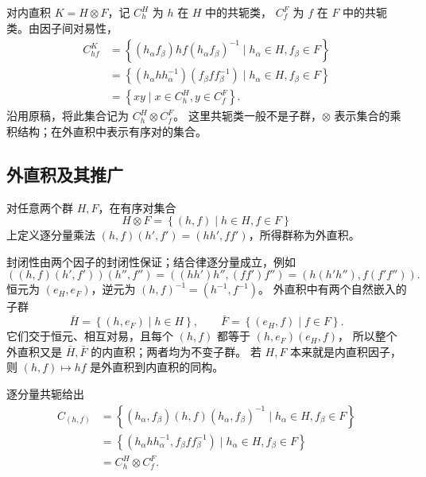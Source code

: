对内直积 $K=H\otimes F$，记 $C_h^H$ 为 $h$ 在 $H$ 中的共轭类，
$C_f^F$ 为 $f$ 在 $F$ 中的共轭类。由因子间对易性，
\begin{align}
C_{hf}^{K}
&=\left\{\left(h_\alpha f_\beta\right)hf\left(h_\alpha f_\beta\right)^{-1}
       \mid h_\alpha\in H,f_\beta\in F\right\}\\
&=\left\{\left(h_\alpha h h_\alpha^{-1}\right)\left(f_\beta f f_\beta^{-1}\right)
       \mid h_\alpha\in H,f_\beta\in F\right\}\\
&=\left\{xy\mid x\in C_h^H,y\in C_f^F\right\}.
\end{align}
沿用原稿，将此集合记为 $C_h^H\otimes C_f^F$。
这里共轭类一般不是子群，$\otimes$ 表示集合的乘积结构；在外直积中表示有序对的集合。

\subsection{外直积及其推广}
\begin{definition}[外直积]
对任意两个群 $H,F$，在有序对集合
\begin{equation}
H\otimes F=\left\{\left(h,f\right)\mid h\in H,f\in F\right\}
\end{equation}
上定义逐分量乘法 $\left(h,f\right)\left(h',f'\right)=\left(hh',ff'\right)$，所得群称为外直积。
\end{definition}
封闭性由两个因子的封闭性保证；结合律逐分量成立，例如
\begin{equation}
\left(\left(h,f\right)\left(h',f'\right)\right)\left(h'',f''\right)
=\left(\left(hh'\right)h'',\left(ff'\right)f''\right)=\left(h\left(h'h''\right),f\left(f'f''\right)\right).
\end{equation}
恒元为 $\left(e_H,e_F\right)$，逆元为 $\left(h,f\right)^{-1}=\left(h^{-1},f^{-1}\right)$。
外直积中有两个自然嵌入的子群
\begin{equation}
\bar H=\left\{\left(h,e_F\right)\mid h\in H\right\},\qquad
\bar F=\left\{\left(e_H,f\right)\mid f\in F\right\}.
\end{equation}
它们交于恒元、相互对易，且每个 $\left(h,f\right)$ 都等于 $\left(h,e_F\right)\left(e_H,f\right)$，
所以整个外直积又是 $\bar H,\bar F$ 的内直积；两者均为不变子群。
若 $H,F$ 本来就是内直积因子，则 $\left(h,f\right)\mapsto hf$ 是外直积到内直积的同构。

逐分量共轭给出
\begin{align}
C_{\left(h,f\right)}
&=\left\{\left(h_\alpha,f_\beta\right)\left(h,f\right)\left(h_\alpha,f_\beta\right)^{-1}
          \mid h_\alpha\in H,f_\beta\in F\right\}\\
&=\left\{\left(h_\alpha h h_\alpha^{-1},f_\beta f f_\beta^{-1}\right)
          \mid h_\alpha\in H,f_\beta\in F\right\}\\
&=C_h^H\otimes C_f^F.
\end{align}

